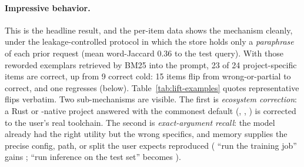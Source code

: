\paragraph{Impressive behavior.}
This is the headline result, and the per-item data shows the mechanism cleanly, under the
leakage-controlled protocol in which the store holds only a \emph{paraphrase} of each
prior request (mean word-Jaccard 0.36 to the test query). With those reworded exemplars
retrieved by BM25 into the prompt, 23 of 24 project-specific items are correct, up from 9
correct cold: 15 items flip from wrong-or-partial to correct, and one regresses (below).
Table~\ref{tab:lift-examples} quotes representative flips verbatim. Two sub-mechanisms
are visible. The first is \emph{ecosystem correction}: a Rust or -native project
answered with the commonest default (, , ) is
corrected to the user's real toolchain. The second is \emph{exact-argument recall}: the
model already had the right utility but the wrong specifics, and memory supplies the
precise config, path, or split the user expects reproduced ( ``run the training
job'' gains ;  ``run inference on the test
set'' becomes ).

